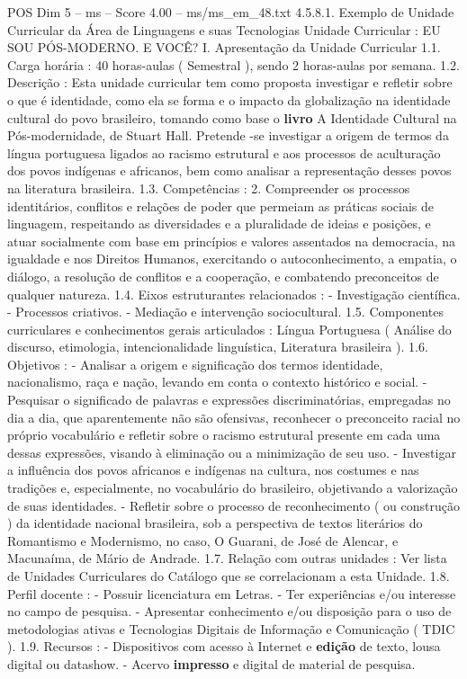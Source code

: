 \begin{textsample}{POS Dim 5 – ms – Score 4.00 – ms/ms\_em\_48.txt}  \label{ex:f5_pos_220}
4.5.8.1.
Exemplo de Unidade Curricular da Área de Linguagens e suas Tecnologias Unidade Curricular : EU SOU PÓS-MODERNO.
E VOCÊ?
I.
Apresentação da Unidade Curricular 1.1.
Carga horária : 40 horas-aulas ( Semestral ), sendo 2 horas-aulas por semana. 1.2.
Descrição : Esta unidade curricular tem como proposta investigar e refletir sobre o que é identidade, como ela se forma e o impacto da globalização na identidade cultural do povo brasileiro, tomando como base o \textbf{livro} A Identidade Cultural na Pós-modernidade, de Stuart Hall.
Pretende -se investigar a origem de termos da língua portuguesa ligados ao racismo estrutural e aos processos de aculturação dos povos indígenas e africanos, bem como analisar a representação desses povos na literatura brasileira. 1.3.
Competências : 2.
Compreender os processos identitários, conflitos e relações de poder que permeiam as práticas sociais de linguagem, respeitando as diversidades e a pluralidade de ideias e posições, e atuar socialmente com base em princípios e valores assentados na democracia, na igualdade e nos Direitos Humanos, exercitando o autoconhecimento, a empatia, o diálogo, a resolução de conflitos e a cooperação, e combatendo preconceitos de qualquer natureza. 1.4.
Eixos estruturantes relacionados : - Investigação científica. - Processos criativos. - Mediação e intervenção sociocultural. 1.5.
Componentes curriculares e conhecimentos gerais articulados : Língua Portuguesa ( Análise do discurso, etimologia, intencionalidade linguística, Literatura brasileira ). 1.6.
Objetivos : - Analisar a origem e significação dos termos identidade, nacionalismo, raça e nação, levando em conta o contexto histórico e social. - Pesquisar o significado de palavras e expressões discriminatórias, empregadas no dia a dia, que aparentemente não são ofensivas, reconhecer o preconceito racial no próprio vocabulário e refletir sobre o racismo estrutural presente em cada uma dessas expressões, visando à eliminação ou a minimização de seu uso. - Investigar a influência dos povos africanos e indígenas na cultura, nos costumes e nas tradições e, especialmente, no vocabulário do brasileiro, objetivando a valorização de suas identidades. - Refletir sobre o processo de reconhecimento ( ou construção ) da identidade nacional brasileira, sob a perspectiva de textos literários do Romantismo e Modernismo, no caso, O Guarani, de José de Alencar, e Macunaíma, de Mário de Andrade. 1.7.
Relação com outras unidades : Ver lista de Unidades Curriculares do Catálogo que se correlacionam a esta Unidade. 1.8.
Perfil docente : - Possuir licenciatura em Letras. - Ter experiências e/ou interesse no campo de pesquisa. - Apresentar conhecimento e/ou disposição para o uso de metodologias ativas e Tecnologias Digitais de Informação e Comunicação ( TDIC ). 1.9.
Recursos : - Dispositivos com acesso à Internet e \textbf{edição} de texto, lousa digital ou datashow. - Acervo \textbf{impresso} e digital de material de pesquisa.

\end{textsample}
